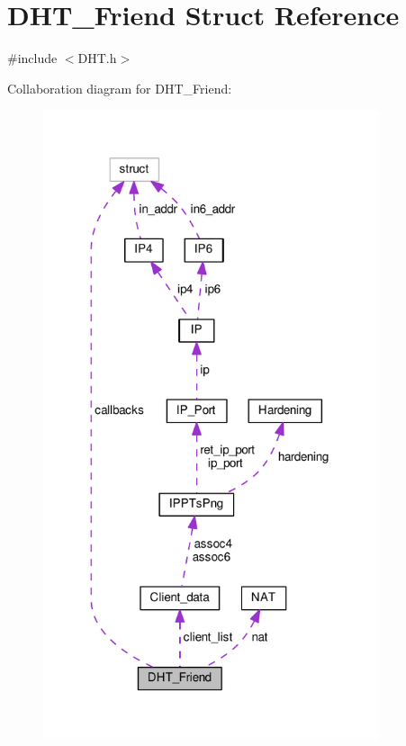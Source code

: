 \hypertarget{struct_d_h_t___friend}{\section{D\+H\+T\+\_\+\+Friend Struct Reference}
\label{struct_d_h_t___friend}
}


{\ttfamily \#include $<$D\+H\+T.\+h$>$}



Collaboration diagram for D\+H\+T\+\_\+\+Friend\+:
\nopagebreak
\begin{figure}[H]
\begin{center}
\leavevmode
\includegraphics[width=279pt]{d6/da5/struct_d_h_t___friend__coll__graph}
\end{center}
\end{figure}
